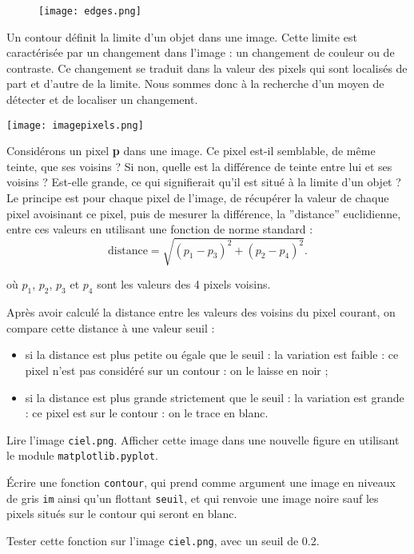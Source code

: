\begin{figure}[!h]
\centering
\texttt{[image: edges.png]}
\end{figure}

Un contour définit la limite d'un objet dans une image. Cette limite est caractérisée par un changement
dans l'image : un changement de couleur ou de contraste. Ce changement se traduit dans la valeur des pixels qui sont localisés de part et d’autre de la limite.
Nous sommes donc à la recherche d’un moyen de détecter et de localiser un changement.\\

\begin{marginfigure}
\centering
\texttt{[image: imagepixels.png]}
\end{marginfigure}


Considérons un pixel \textbf{p} dans une image. Ce pixel est-il semblable, de même teinte, que ses voisins ? Si non, quelle est la différence de teinte entre lui et ses voisins ? Est-elle grande, ce qui signifierait qu’il est situé à la limite d’un objet ?\\
Le principe est pour chaque pixel de l'image, de récupérer la valeur de chaque pixel avoisinant ce pixel, puis de mesurer la différence, la ”distance” euclidienne, entre ces valeurs en utilisant une fonction de norme standard :
$$
\text{distance}=\sqrt{(p_1-p_3)^2+(p_2-p_4)^2}.
$$



 où $ p_1$, $p_2$, $ p_3$ et $ p_4$ sont les valeurs des 4 pixels voisins.


Après avoir calculé la distance entre les valeurs des voisins du pixel courant, on compare cette distance à une valeur seuil :
\begin{itemize}
\item si la distance est plus petite ou égale que le seuil : la variation est faible : ce pixel n'est pas considéré sur un contour : on le laisse en noir ;
\item si la distance est plus grande strictement que le seuil : la variation est grande : ce pixel est sur le contour : on le trace en blanc.
\end{itemize}


\begin{question}
Lire l'image \lstinline{ciel.png}. Afficher cette image dans une nouvelle figure en utilisant le module \lstinline{matplotlib.pyplot}.
\end{question}



\begin{question}
\'Ecrire une fonction \lstinline{contour}, qui prend comme argument une image en niveaux de gris \lstinline{im} ainsi qu'un flottant \lstinline{seuil}, et qui renvoie une image noire sauf les pixels situés sur le contour qui seront en blanc.
\end{question}

\begin{question}
Tester cette fonction sur l'image  \lstinline{ciel.png}, avec un seuil de 0.2.
\end{question}

